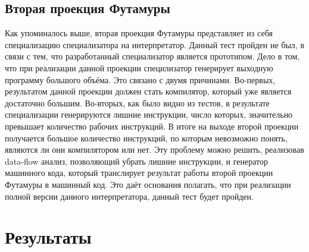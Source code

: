 \subsection{ Вторая проекция Футамуры}
Как упоминалось выше, вторая проекция Футамуры представляет из себя специализацию специализатора на интерпретатор. Данный тест пройден не был, в связи с тем, что разработанный специализатор является прототипом. Дело в том, что при реализации данной проекции специлизатор генерирует выходную программу большого объёма. Это связано с двумя причинами. Во-первых, результатом данной проекции должен стать компилятор, который уже является достаточно большим. Во-вторых, как было видно из тестов, в результате специализации генерируются лишние инструкции, число которых, значительно превышает количество рабочих инструкций. В итоге на выходе второй проекции получается большое количество инструкций, по которым невозможно понять, являются ли они компилятором или нет. Эту проблему можно решить, реализовав data-flow анализ, позволяющий убрать лишние инструкции, и генератор машинного кода, который транслирует результат работы второй проекции Футамуры в машинный код. Это даёт основания полагать, что при реализации полной версии данного интерпретатора, данный тест будет пройден.

\section*{Результаты}


